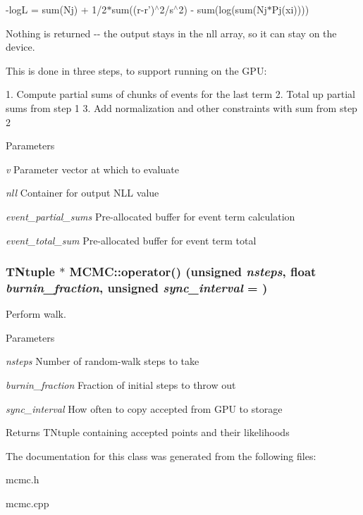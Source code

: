 -\/logL = sum(Nj) + 1/2$\ast$sum((r-\/r')$^\wedge$2/s$^\wedge$2) -\/ sum(log(sum(Nj$\ast$Pj(xi))))

Nothing is returned -\/-\/ the output stays in the nll array, so it can stay on the device.

This is done in three steps, to support running on the GPU:

1. Compute partial sums of chunks of events for the last term 2. Total up partial sums from step 1 3. Add normalization and other constraints with sum from step 2


\begin{DoxyParams}{Parameters}
\item[{\em v}]Parameter vector at which to evaluate \item[{\em nll}]Container for output NLL value \item[{\em event\_\-partial\_\-sums}]Pre-\/allocated buffer for event term calculation \item[{\em event\_\-total\_\-sum}]Pre-\/allocated buffer for event term total \end{DoxyParams}
\hypertarget{classMCMC_ac76eeacb8a362af4c62c596380b8da64}{
\subsubsection[{operator()}]{\setlength{\rightskip}{0pt plus 5cm}TNtuple $\ast$ MCMC::operator() (unsigned {\em nsteps}, \/  float {\em burnin\_\-fraction}, \/  unsigned {\em sync\_\-interval} = {})}}
\label{classMCMC_ac76eeacb8a362af4c62c596380b8da64}
Perform walk.


\begin{DoxyParams}{Parameters}
\item[{\em nsteps}]Number of random-\/walk steps to take \item[{\em burnin\_\-fraction}]Fraction of initial steps to throw out \item[{\em sync\_\-interval}]How often to copy accepted from GPU to storage \end{DoxyParams}
\begin{DoxyReturn}{Returns}
TNtuple containing accepted points and their likelihoods 
\end{DoxyReturn}


The documentation for this class was generated from the following files:\begin{DoxyCompactItemize}
\item 
mcmc.h\item 
mcmc.cpp\end{DoxyCompactItemize}
